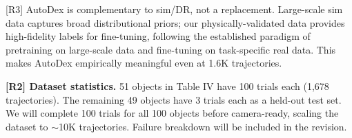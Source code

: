 \documentclass[conference]{IEEEtran}
\newcommand{\rtwo}{{\color{R2}R2}}
\newcommand{\rthree}{{\color{R3}R3}}
\newcommand{\rssparagraph}[1]{{\bf #1.}}
\begin{document}
[\rthree] AutoDex is complementary to sim/DR, not a replacement. Large-scale sim data captures broad distributional priors; our physically-validated data provides high-fidelity labels for fine-tuning, following the established paradigm of pretraining on large-scale data and fine-tuning on task-specific real data. This makes AutoDex empirically meaningful even at 1.6K trajectories.

\rssparagraph{[\rtwo] Dataset statistics}
51 objects in Table IV have 100 trials each (1,678 trajectories). The remaining 49 objects have 3 trials each as a held-out test set. We will complete 100 trials for all 100 objects before camera-ready, scaling the dataset to $\sim$10K trajectories. Failure breakdown will be included in the revision.

{
  \small
  
  
}
\end{document}
